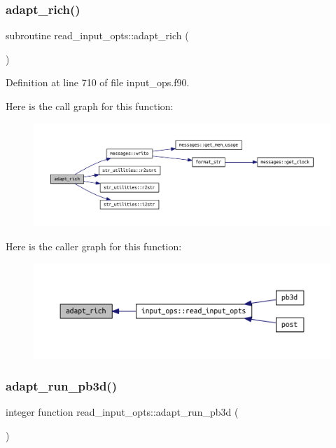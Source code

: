 \subsubsection{\texorpdfstring{adapt\+\_\+rich()}{adapt\_rich()}}
{\footnotesize\ttfamily subroutine read\+\_\+input\+\_\+opts\+::adapt\+\_\+rich (\begin{DoxyParamCaption}{ }\end{DoxyParamCaption})}



Definition at line 710 of file input\+\_\+ops.\+f90.

Here is the call graph for this function\+:
\nopagebreak
\begin{figure}[H]
\begin{center}
\leavevmode
\includegraphics[width=350pt]{input__ops_8f90_ab580aa4852afcd4a9de50b1b98de14cb_cgraph}
\end{center}
\end{figure}
Here is the caller graph for this function\+:
\nopagebreak
\begin{figure}[H]
\begin{center}
\leavevmode
\includegraphics[width=350pt]{input__ops_8f90_ab580aa4852afcd4a9de50b1b98de14cb_icgraph}
\end{center}
\end{figure}
\mbox{\label{input__ops_8f90_a4f2af8cdda395ccda6a1adea6c1d578c}} 
\subsubsection{\texorpdfstring{adapt\+\_\+run\+\_\+pb3d()}{adapt\_run\_pb3d()}}
{\footnotesize\ttfamily integer function read\+\_\+input\+\_\+opts\+::adapt\+\_\+run\+\_\+pb3d (\begin{DoxyParamCaption}{ }\end{DoxyParamCaption})}




